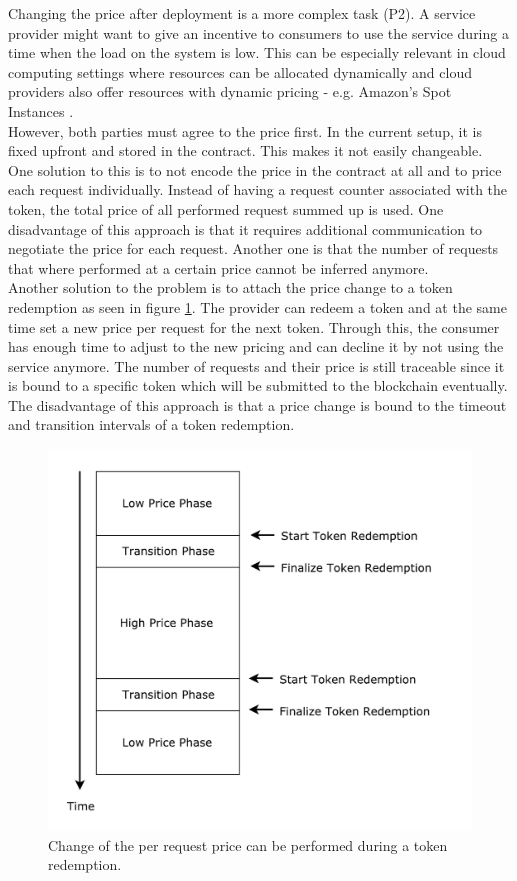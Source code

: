 \documentclass[a4paper,12pt]{scrartcl}
\begin{document}
Changing the price after deployment is a more complex task (P2). A service provider might want to give an incentive to consumers to use the service during a time when the load on the system is low. This can be especially relevant in cloud computing settings where resources can be allocated dynamically and cloud providers also offer resources with dynamic pricing - e.g. Amazon's Spot Instances \cite{web96}.\\
However, both parties must agree to the price first. In the current setup, it is fixed upfront and stored in the contract. This makes it not easily changeable.\\
One solution to this is to not encode the price in the contract at all and to price each request individually. Instead of having a request counter associated with the token, the total price of all performed request summed up is used. One disadvantage of this approach is that it requires additional communication to negotiate the price for each request. Another one is that the number of requests that where performed at a certain price cannot be inferred anymore.\\
Another solution to the problem is to attach the price change to a token redemption as seen in figure \ref{fig:DynamicPricing}. The provider can redeem a token and at the same time set a new price per request for the next token. Through this, the consumer has enough time to adjust to the new pricing and can decline it by not using the service anymore. The number of requests and their price is still traceable since it is bound to a specific token which will be submitted to the blockchain eventually. The disadvantage of this approach is that a price change is bound to the timeout and transition intervals of a token redemption.\\

\begin{figure}[H]
\centering
\includegraphics[width=400pt]{Images/DynamicPricing.pdf}
\caption{Change of the per request price can be performed during a token redemption.}
\label{fig:DynamicPricing}
\end{figure}
\end{document}
